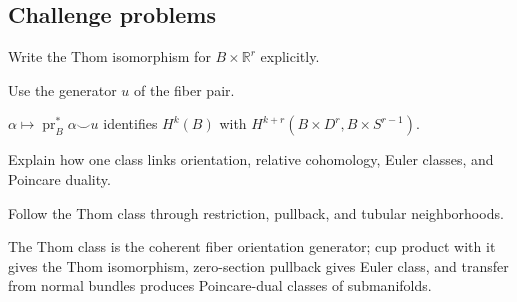\subsection*{Challenge problems}

\begin{exercise}\label{exr:viii31-ped-15}
Write the Thom isomorphism for $B\times\mathbb R^r$ explicitly.
\end{exercise}
\begin{hint}
Use the generator $u$ of the fiber pair.
\end{hint}
\begin{solution}
$\alpha\mapsto \operatorname{pr}_B^*\alpha\smile u$ identifies $H^k(B)$ with $H^{k+r}(B\times D^r,B\times S^{r-1})$.
\end{solution}

\begin{exercise}\label{exr:viii31-ped-16}
Explain how one class links orientation, relative cohomology, Euler classes, and Poincare duality.
\end{exercise}
\begin{hint}
Follow the Thom class through restriction, pullback, and tubular neighborhoods.
\end{hint}
\begin{solution}
The Thom class is the coherent fiber orientation generator; cup product with it gives the Thom isomorphism, zero-section pullback gives Euler class, and transfer from normal bundles produces Poincare-dual classes of submanifolds.
\end{solution}

